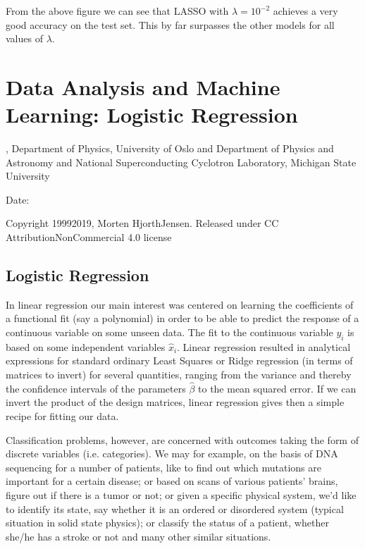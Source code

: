 \documentclass[letterpaper,10pt,english]{sphinxmanual}
\begin{document}
From the above figure we can see that LASSO with \(\lambda = 10^{-2}\)
achieves a very good accuracy on the test set. This by far surpasses the
other models for all values of \(\lambda\).




\section{Data Analysis and Machine Learning: Logistic Regression}
\label{\detokenize{chapter5:data-analysis-and-machine-learning-logistic-regression}}\label{\detokenize{chapter5::doc}}




, Department of Physics, University of Oslo and Department of Physics and Astronomy and National Superconducting Cyclotron Laboratory, Michigan State University

Date: 

Copyright 1999\sphinxhyphen{}2019, Morten Hjorth\sphinxhyphen{}Jensen. Released under CC Attribution\sphinxhyphen{}NonCommercial 4.0 license




\subsection{Logistic Regression}
\label{\detokenize{chapter5:logistic-regression}}
In linear regression our main interest was centered on learning the
coefficients of a functional fit (say a polynomial) in order to be
able to predict the response of a continuous variable on some unseen
data. The fit to the continuous variable \(y_i\) is based on some
independent variables \(\hat{x}_i\). Linear regression resulted in
analytical expressions for standard ordinary Least Squares or Ridge
regression (in terms of matrices to invert) for several quantities,
ranging from the variance and thereby the confidence intervals of the
parameters \(\hat{\beta}\) to the mean squared error. If we can invert
the product of the design matrices, linear regression gives then a
simple recipe for fitting our data.

Classification problems, however, are concerned with outcomes taking
the form of discrete variables (i.e. categories). We may for example,
on the basis of DNA sequencing for a number of patients, like to find
out which mutations are important for a certain disease; or based on
scans of various patients’ brains, figure out if there is a tumor or
not; or given a specific physical system, we’d like to identify its
state, say whether it is an ordered or disordered system (typical
situation in solid state physics); or classify the status of a
patient, whether she/he has a stroke or not and many other similar
situations.
\end{document}
